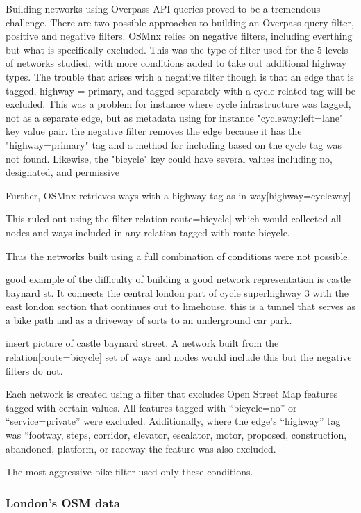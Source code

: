 Building networks using Overpass API queries proved to be a tremendous challenge. There are two possible approaches to building an Overpass query filter, positive and negative filters. OSMnx relies on negative filters, including everthing but what is specifically excluded. This was the type of filter used for the 5 levels of networks studied, with more conditions added to take out additional highway types. The trouble that arises with a negative filter though is that an edge that is tagged, highway = primary, and tagged separately with a cycle related tag will be excluded. This was a problem for instance where cycle infrastructure was tagged, not as a separate edge, but as metadata using for instance "cycleway:left=lane" key value pair. the negative filter removes the edge because it has the "highway=primary" tag and a method for including based on the cycle tag was not found. Likewise, the "bicycle" key could have several values including no, designated, and permissive

Further, OSMnx retrieves ways with a highway tag as in way[highway=cycleway]

This ruled out using the filter relation[route=bicycle]  which would collected all nodes and ways included in any relation tagged with route-bicycle. 

Thus the networks built using a  full combination of conditions were not possible. 

good example of the difficulty of building a good network representation is castle baynard st. It connects the central london part of cycle superhighway 3 with the east london section that continues out to limehouse. this is a tunnel that serves as a bike path and as a driveway of sorts to an underground car park. 

insert picture of castle baynard street. A network built from the relation[route=bicycle] set of ways and nodes would include this but the negative filters do not. 



Each network is created using a filter that excludes Open Street Map features tagged with certain values. All features tagged with ``bicycle=no'' or ``service=private'' were excluded. Additionally, where the edge's ``highway'' tag was ``footway, steps, corridor, elevator, escalator, motor, proposed, construction, abandoned, platform, or raceway the feature was also excluded. 

The most aggressive bike filter used only these conditions.


\subsubsection{London's OSM data}


